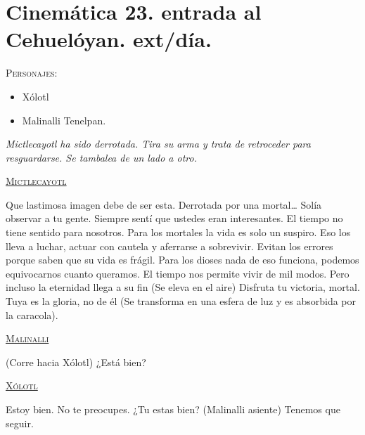 \documentclass[11pt,letterpaper]{article}
\begin{document}
\section{Cinemática 23. entrada al Cehuelóyan. ext/día.}
\textsc{Personajes}:
\begin{itemize}
\item Xólotl
\item Malinalli Tenelpan.
\end{itemize}
\textit{Mictlecayotl ha sido derrotada. Tira su arma y trata de retroceder para resguardarse. Se tambalea de un lado a otro.}
\begin{center}
\textsc{\underline{Mictlecayotl}}
\\
\par
Que lastimosa imagen debe de ser esta. Derrotada por una mortal… Solía observar a tu gente. Siempre sentí que ustedes eran interesantes. El tiempo no tiene sentido para nosotros. Para los mortales la vida es solo un suspiro. Eso los lleva a luchar, actuar con cautela y aferrarse a sobrevivir. Evitan los errores porque saben que su vida es frágil. Para los dioses nada de eso funciona, podemos equivocarnos cuanto queramos. El tiempo nos permite vivir de mil modos. Pero incluso la eternidad llega a su fin (Se eleva en el aire) Disfruta tu victoria, mortal. Tuya es la gloria, no de él (Se transforma en una esfera de luz y es absorbida por la caracola).
\\
\par
 \textsc{\underline{Malinalli}}
 \\
\par
(Corre hacia Xólotl) ¿Está bien?
\\
\par
\textsc{\underline{Xólotl}}
\\
\par
Estoy bien. No te preocupes. ¿Tu estas bien? (Malinalli asiente) Tenemos que seguir.
\end{center}
\end{document}
